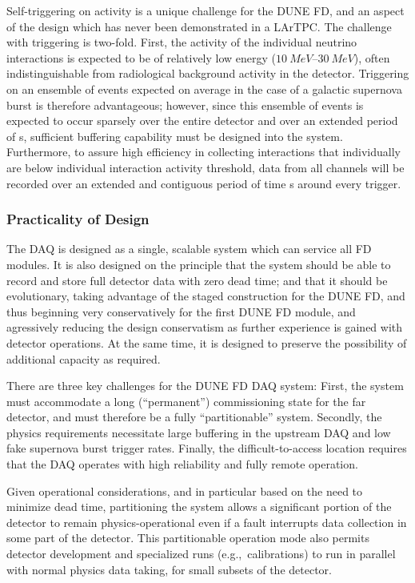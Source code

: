 Self-triggering on  activity is a unique challenge for the
DUNE FD, and an aspect of the design which has never been demonstrated
in a LArTPC. The challenge with  triggering is two-fold. 
First, the activity of the individual  neutrino interactions
is expected to be of relatively low energy ($\SIrange{10}{30}{MeV}$),
often indistinguishable from radiological background activity in the
detector.  Triggering on an ensemble of  events expected on
average in the case of a galactic supernova burst is therefore
advantageous; however, since this ensemble of events is expected to occur sparsely over the
entire detector and over an extended period of \si{s},
sufficient buffering capability must be designed into the system. 
Furthermore, to assure high efficiency in collecting  interactions
that individually are below individual interaction activity threshold, data from
all channels will be recorded over an extended and contiguous period of
time \si{s} around every  trigger.

 

\subsubsection{Practicality of Design}

The DAQ is designed as a single, scalable system which can service
all FD modules. It is also designed on the principle that the system should be
able to record and store full detector data with zero dead time; and
that it should be evolutionary, taking advantage of the staged
construction for the DUNE FD, and thus beginning very conservatively
for the first DUNE FD module, and agressively reducing the design
conservatism as further experience is gained with detector
operations. At the same time, it is designed to preserve the possibility of additional capacity
as required.

There are three key challenges for the DUNE FD DAQ system: First, the system must accommodate
a long (``permanent'') commissioning state for the far detector, and
must therefore be a fully ``partitionable'' system. Secondly, the   physics
requirements necessitate large buffering in the upstream DAQ and low fake
supernova burst trigger rates. Finally, the difficult-to-access
location requires that the DAQ operates with high reliability and fully remote operation.

Given operational considerations, and in particular based
on the need to minimize  dead time, partitioning the  system allows 
a significant portion of the detector to remain physics-operational
even if a fault interrupts data collection in
some part of the detector. 
This partitionable operation mode also
permits detector development and specialized runs (e.g.,~calibrations)
to run in parallel with normal physics data taking, for small subsets
of the detector.

